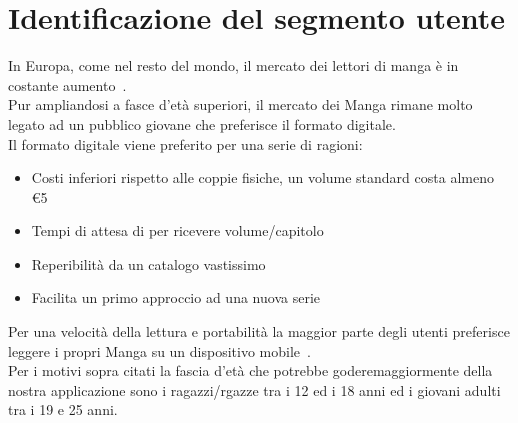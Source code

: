 \documentclass[../Assignment-3-LPSMT.tex]{subfiles}
\begin{document}
\chapter{Identificazione del segmento utente}

In Europa, come nel resto del mondo, il mercato dei lettori di manga è
in costante aumento~\cite{mangaOut}.\\
Pur ampliandosi a fasce d'età superiori, il mercato dei Manga rimane
molto legato ad un pubblico giovane che preferisce il formato digitale.\\
Il formato digitale viene preferito per una serie di ragioni:

\begin{itemize}
	\item Costi inferiori rispetto alle coppie fisiche, un volume standard costa almeno \euro{5}
	\item Tempi di attesa di per ricevere volume/capitolo
	\item Reperibilità da un catalogo vastissimo
	\item Facilita un primo approccio ad una nuova serie
\end{itemize}

Per una velocità della lettura e portabilità la maggior parte degli utenti preferisce leggere i propri Manga su un dispositivo mobile~\cite{NLTreport}.\\
Per i motivi sopra citati la fascia d'età che potrebbe goderemaggiormente della nostra applicazione sono i ragazzi/rgazze tra i 12 ed i 18 anni ed i giovani adulti tra i 19 e 25 anni.
\end{document}
